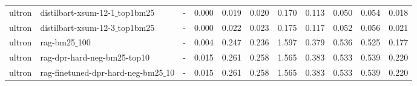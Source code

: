 \begin{tabular}{@{}llCCCCCCCCC@{}}
ultron   & distilbart-xsum-12-1$\_$top1bm25      & -         & 0.000     & 0.019     & 0.020     & 0.170     & 0.113     & 0.050     & 0.054      & 0.018      \\
ultron   & distilbart-xsum-12-3$\_$top1bm25      & -         & 0.000     & 0.022     & 0.023     & 0.175     & 0.117     & 0.052     & 0.056      & 0.021      \\
ultron   & rag-bm25$\_$100                       & -         & 0.004     & 0.247     & 0.236     & 1.597     & 0.379     & 0.536     & 0.525      & 0.177      \\
ultron   & rag-dpr-hard-neg-bm25-top10           & -         & 0.015     & 0.261     & 0.258     & 1.565     & 0.383     & 0.533     & 0.539      & 0.220      \\
ultron   & rag-finetuned-dpr-hard-neg-bm25$\_$10 & -         & 0.015     & 0.261     & 0.258     & 1.565     & 0.383     & 0.533     & 0.539      & 0.220      \\
\bottomrule
\end{tabular}

